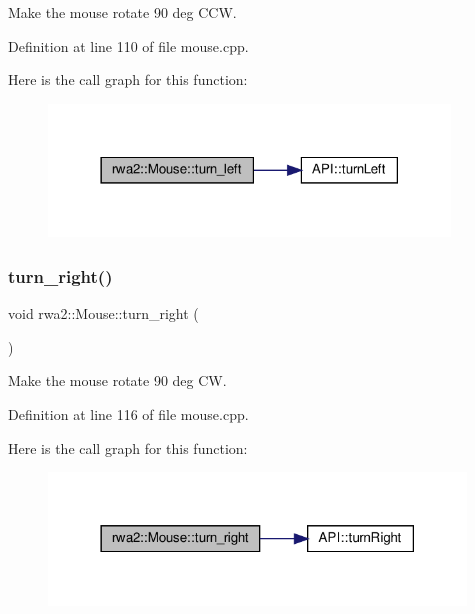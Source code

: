 Make the mouse rotate 90 deg C\+CW. 



Definition at line 110 of file mouse.\+cpp.

Here is the call graph for this function\+:
\nopagebreak
\begin{figure}[H]
\begin{center}
\leavevmode
\includegraphics[width=302pt]{classrwa2_1_1_mouse_a5748e94e740432c334d15364fb476919_cgraph}
\end{center}
\end{figure}
\mbox{\label{classrwa2_1_1_mouse_ac929127d86fc4a41d1e216968b1dae20}} 
\subsubsection{\texorpdfstring{turn\+\_\+right()}{turn\_right()}}
{\footnotesize\ttfamily void rwa2\+::\+Mouse\+::turn\+\_\+right (\begin{DoxyParamCaption}{ }\end{DoxyParamCaption})}



Make the mouse rotate 90 deg CW. 



Definition at line 116 of file mouse.\+cpp.

Here is the call graph for this function\+:
\nopagebreak
\begin{figure}[H]
\begin{center}
\leavevmode
\includegraphics[width=314pt]{classrwa2_1_1_mouse_ac929127d86fc4a41d1e216968b1dae20_cgraph}
\end{center}
\end{figure}
\mbox{\label{classrwa2_1_1_mouse_a069b6c1433777dd7d2709814aa418463}} 
